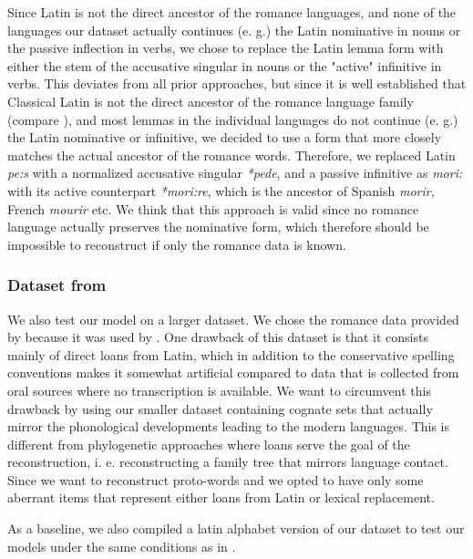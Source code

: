 Since Latin is not the direct ancestor of the romance languages, and none of the languages our dataset
actually continues (e. g.) the Latin nominative in nouns or the passive inflection in verbs, we chose
to replace the Latin lemma form with either the stem of the accusative singular in nouns or the "active"
infinitive in verbs. This deviates from all prior approaches, but since it is well established that Classical Latin
is not the direct ancestor of the romance language family (compare \citet{Dworkin_2016}), and most lemmas in the individual languages
do not continue (e. g.) the Latin nominative or infinitive, we decided to use a form that more closely matches the actual
ancestor of the romance words. Therefore, we replaced Latin \textit{pe:s} with a normalized accusative singular \textit{*pede},
and a passive infinitive as \textit{mori:} with its active counterpart \textit{*mori:re}, which is the ancestor of Spanish \textit{morir}, 
French \textit{mourir} etc. We think that this approach is valid since no romance language actually preserves the nominative form,
which therefore should be impossible to reconstruct if only the romance data is known.

\subsubsection{Dataset from \citet{ciobanu-dinu-2014-automatic}}
We also test our model on a larger dataset. We chose the romance data provided by \citet{ciobanu-dinu-2014-automatic} because it was used by
\citet{meloni2019ab}. One drawback of this dataset is that it consists mainly of direct loans from Latin, which in addition to the conservative spelling
conventions makes it somewhat artificial compared to data that is collected from oral sources where no transcription is available. We want to circumvent this
drawback by using our smaller dataset containing cognate sets that actually mirror the phonological developments leading to the modern languages.
This is different from phylogenetic approaches where loans serve the goal of the reconstruction, i. e. reconstructing a family tree that mirrors language contact.
Since we want to reconstruct proto-words and we opted to have only some aberrant items that represent either loans from Latin or lexical replacement.

As a baseline, we also compiled a latin alphabet version of our dataset to test our models under the same conditions as in \citet{meloni2019ab}.


